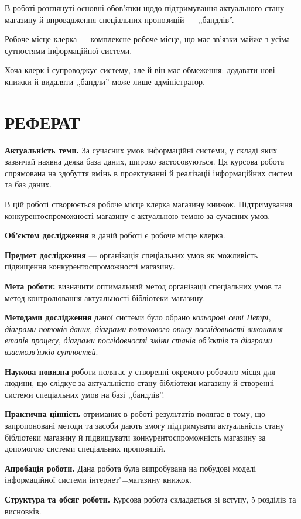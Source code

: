 \documentclass[a4paper,notitlepage,headsepline,pdftex,oneside]{report}
\newcommand{\setfontsize}[1]{\fontsize{#1pt}{#1pt}\selectfont}
\newcommand{\uChapter}[1]{\chapter*{#1}\pagestyle{fancy}\renewcommand{\baselinestretch}{1.5}\setfontsize{14pt}}
\begin{document}
  В роботі розглянуті основні обов’язки щодо підтримування актуального стану
  магазину й впровадження спеціальних пропозицій --- ,,бандлів''.

  Робоче місце клерка --- комплексне робоче місце, що має зв’язки майже з
  усіма сутностями інформаційної системи.

  Хоча клерк і супроводжує систему, але й він має обмеження: додавати нові
  книжки й видаляти ,,бандли'' може лише адміністратор.
  \clearpage
\uChapter{РЕФЕРАТ}
  \textbf{Актуальність теми.}
    За сучасних умов інформаційні системи, у складі яких зазвичай наявна деяка
    база даних, широко застосовуються.
    Ця курсова робота спрямована на здобуття вмінь в проектуванні й реалізації
    інформаційних систем та баз даних.

    В цій роботі створюється робоче місце клерка магазину книжок.
    Підтримування конкурентоспроможності магазину є актуальною темою за
    сучасних умов.

  \textbf{Об’єктом дослідження} в даній роботі є робоче місце клерка.

  \textbf{Предмет дослідження} --- організація спеціальних умов як можливість
  підвищення конкурентоспроможності магазину.

  \textbf{Мета роботи:} визначити оптимальний метод організації спеціальних
  умов та метод контролювання актуальності бібліотеки магазину.

  \textbf{Методами дослідження} даної системи було обрано \emph{кольорові
  сеті Петрі}, \emph{діаграми потоків даних}, \emph{діаграми потокового опису
  послідовності виконання етапів процесу}, \emph{діаграми послідовності зміни
  станів об’єктів} та \emph{діаграми взаємозв’язків сутностей}.

  \textbf{Наукова новизна} роботи полягає у створенні окремого робочого місця
  для людини, що слідкує за актуальністю стану бібліотеки магазину й створенні
  системи спеціальних умов на базі ,,бандлів''.

  \textbf{Практична цінність} отриманих в роботі результатів полягає в тому,
  що запропоновані методи та засоби дають змогу підтримувати актуальність
  стану бібліотеки магазину й підвищувати конкурентоспроможність магазину за
  допомогою системи спеціальних пропозицій.

  \textbf{Апробація роботи.}
  Дана робота була випробувана на побудові моделі інформаційної системи
  інтернет"=магазину книжок.

  \textbf{Структура та обсяг роботи.}
    Курсова робота складається зі вступу, 5 розділів та висновків.
\end{document}
